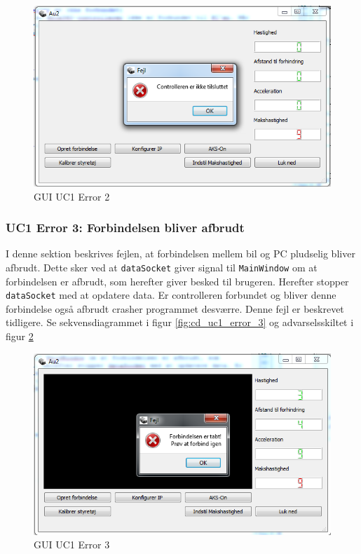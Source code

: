 \begin{figure}[h!]
\centering
\includegraphics[width=\textwidth* 6/9]{../fig/billeder/gui_uc1_error_2.png}
\caption{GUI UC1 Error 2}
\label{fig:GUI_uc1_error_2}
\end{figure}

\clearpage

\subsubsection{UC1 Error 3: Forbindelsen bliver afbrudt}
I denne sektion beskrives fejlen, at forbindelsen mellem bil og PC pludselig bliver afbrudt. Dette sker ved at \texttt{dataSocket} giver signal til \texttt{MainWindow} om at forbindelsen er afbrudt, som herefter giver besked til brugeren. Herefter stopper \texttt{dataSocket} med at opdatere data. Er controlleren forbundet og bliver denne forbindelse også afbrudt crasher programmet desværre. Denne fejl er beskrevet tidligere. Se sekvensdiagrammet i figur \ref{fig:cd_uc1_error_3} og advarselsskiltet i figur \ref{fig:GUI_uc1_error_3} 

\begin{figure}[H]
\centering
\includegraphics[width=\textwidth* 3/4]{../fig/billeder/gui_uc1_error_3.png}
\caption{GUI UC1 Error 3}
\label{fig:GUI_uc1_error_3}
\end{figure}
\vfill
\clearpage

